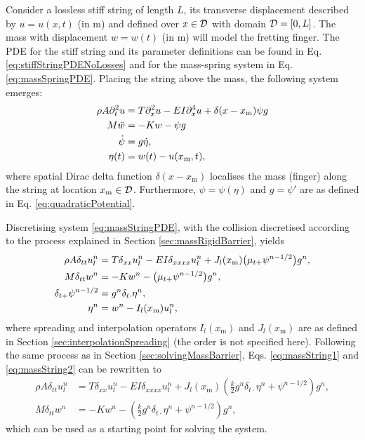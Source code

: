 Consider a lossless stiff string of length $L$, its transverse displacement described by $u = u(x,t)$ (in m) and defined over $x\in \mathcal{D}$ with domain $\mathcal{D} = [0, L]$. The mass with displacement $w = w(t)$ (in m) will model the fretting finger. The PDE for the stiff string and its parameter definitions can be found in Eq. \eqref{eq:stiffStringPDENoLosses} and for the mass-spring system in Eq. \eqref{eq:massSpringPDE}. Placing the string above the mass, the following system emerges:
\begin{subequations}\label{eq:massStringPDE}
\begin{align}   
    \rho A \partial_t^2 u & =T\partial_x^2 u - EI\partial_x^4 u + \delta(x-x_\text{m}) \psi g \label{eq:massStringPDE1}\\
    M \ddot w &=-Kw - \psi g\label{eq:massStringPDE2}\\
    \dot\psi &= g \dot\eta,\label{eq:massStringPDE3}\\
    \eta(t) &= w(t) - u(x_\text{m}, t),\label{eq:massStringPDE4}
\end{align}
\end{subequations}
where spatial Dirac delta function $\delta(x-x_\text{m})$ localises the mass (finger) along the string at location $x_\text{m} \in \mathcal{D}$. Furthermore, $\psi = \psi(\eta)$ and $g=\psi'$ are as defined in Eq. \eqref{eq:quadraticPotential}. 

Discretising system \eqref{eq:massStringPDE}, with the collision discretised according to the process explained in Section \ref{sec:massRigidBarrier}, yields
\begin{subequations}
    \begin{align}   
        \rho A \delta_{tt}u^n_l & =T\delta_{xx}u^n_l - EI\delta_{xxxx}u_l^n + J_l(x_\text{m}) \big(\mu_{t+}\psi^{n-1/2}\big)g^n, \label{eq:massString1}\\
        M \delta_{tt}w^n &=-Kw^n - \big(\mu_{t+}\psi^{n-1/2}\big)g^n,\label{eq:massString2}\\
        \delta_{t+}\psi^{n-1/2} &= g^n\delta_{t\cdot}\eta^n,\label{eq:massString3}\\
        \eta^n &= w^n - I_l(x_\text{m})u_l^n,\label{eq:massString4}
    \end{align}
\end{subequations}
where spreading and interpolation operators $I_l(x_\text{m})$ and $J_l(x_\text{m})$ are as defined in Section \ref{sec:interpolationSpreading} (the order is not specified here). Following the same process as in Section \ref{sec:solvingMassBarrier}, Eqs. \eqref{eq:massString1} and \eqref{eq:massString2} can be rewritten to 
\begin{subequations}\label{eq:massStringComb}
    \begin{align}
        \rho A \delta_{tt}u^n_l & =T\delta_{xx}u^n_l - EI\delta_{xxxx}u_l^n + J_l(x_\text{m}) \left(\frac{k}{2}g^n\delta_{t\cdot}\eta^n + \psi^{n-1/2}\right)g^n,\label{eq:massStringComb1}\\
        M \delta_{tt}w^n &=-Kw^n - \left(\frac{k}{2}g^n\delta_{t\cdot}\eta^n + \psi^{n-1/2}\right)g^n,\label{eq:massStringComb2}
    \end{align}
\end{subequations}
which can be used as a starting point for solving the system.


